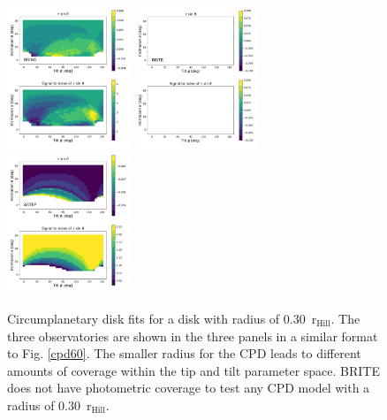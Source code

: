 \documentclass[longauth]{aa} %
\newcommand{\rhill}{$\mathrm{r_{Hill}}$} %
\begin{document}
\begin{figure}[htb]
    \includegraphics[width=0.33\textwidth]{diskfit_BRING_030.pdf}
    \includegraphics[width=0.33\textwidth]{diskfit_BRITE_030.pdf}
    \includegraphics[width=0.33\textwidth]{diskfit_ASTEP_030.pdf}
    \caption{Circumplanetary disk fits for a disk with radius of 0.30\ \rhill. The three observatories are shown in the three panels in a similar format to Fig. \ref{cpd60}. The smaller radius for the CPD leads to different amounts of coverage within the tip and tilt parameter space. BRITE does not have photometric coverage to test any CPD model with a radius of 0.30\ \rhill.}
    \label{cpd30}
\end{figure}
\end{document}
